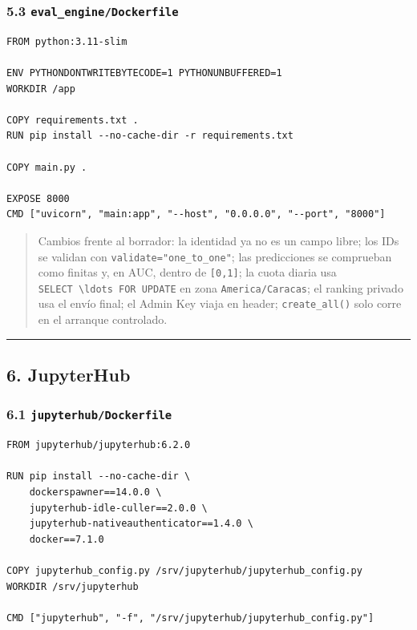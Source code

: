\documentclass[11pt,a4paper]{article}
\begin{document}
\hypertarget{53-eval_enginedockerfile}{%
\subsubsection{\texorpdfstring{5.3 \texttt{eval\_\allowbreak{}engine/\allowbreak{}Dockerfile}}{5.3 eval\_engine/Dockerfile}}\label{53-eval_enginedockerfile}}

\begin{lstlisting}
FROM python:3.11-slim

ENV PYTHONDONTWRITEBYTECODE=1 PYTHONUNBUFFERED=1
WORKDIR /app

COPY requirements.txt .
RUN pip install --no-cache-dir -r requirements.txt

COPY main.py .

EXPOSE 8000
CMD ["uvicorn", "main:app", "--host", "0.0.0.0", "--port", "8000"]
\end{lstlisting}

\begin{quote}
Cambios frente al borrador: la identidad ya no es un campo libre; los IDs se validan con \texttt{validate="one\_\allowbreak{}to\_\allowbreak{}one"}; las predicciones se comprueban como finitas y, en AUC, dentro de \texttt{{[}0,1{]}}; la cuota diaria usa \texttt{SELECT\ \textbackslash{}ldots\ FOR\ UPDATE} en zona \texttt{America/\allowbreak{}Caracas}; el ranking privado usa el envío final; el Admin Key viaja en header; \texttt{create\_\allowbreak{}all()} solo corre en el arranque controlado.
\end{quote}

\begin{center}\rule{0.5\linewidth}{0.5pt}\end{center}

\hypertarget{6-jupyterhub}{%
\subsection{6. JupyterHub}\label{6-jupyterhub}}

\hypertarget{61-jupyterhubdockerfile}{%
\subsubsection{\texorpdfstring{6.1 \texttt{jupyterhub/\allowbreak{}Dockerfile}}{6.1 jupyterhub/Dockerfile}}\label{61-jupyterhubdockerfile}}

\begin{lstlisting}
FROM jupyterhub/jupyterhub:6.2.0

RUN pip install --no-cache-dir \
    dockerspawner==14.0.0 \
    jupyterhub-idle-culler==2.0.0 \
    jupyterhub-nativeauthenticator==1.4.0 \
    docker==7.1.0

COPY jupyterhub_config.py /srv/jupyterhub/jupyterhub_config.py
WORKDIR /srv/jupyterhub

CMD ["jupyterhub", "-f", "/srv/jupyterhub/jupyterhub_config.py"]
\end{lstlisting}
\end{document}
